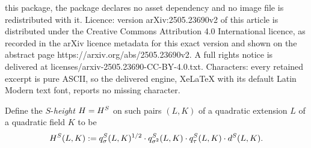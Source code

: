\documentclass[10pt,a4paper]{amsart}
\def\H{{\rm H}}
\newcommand{\D}{{\rm d}}
\newcommand{\q}{{\rm q}}
\begin{document}
this package, the package declares no asset dependency and no image file is redistributed with it. Licence: version arXiv:2505.23690v2 of this article is distributed under the Creative Commons Attribution 4.0 International licence, as recorded in the arXiv licence metadata for this exact version and shown on the abstract page https://arxiv.org/abs/2505.23690v2. A full rights notice is delivered at licenses/arxiv-2505.23690-CC-BY-4.0.txt. Characters: every retained excerpt is pure ASCII, so the delivered engine, XeLaTeX with its default Latin Modern text font, reports no missing character.
\begin{defn}\label{sheight}
Define the $S$-{\it height} $\H=\H^S$ on such pairs $(L,K)$ of a quadratic
extension $L$ of a quadratic field $K$ to be
\begin{equation*}
\H^S(L,K):=\q_\sigma^{S}(L,K)^{1/2} \cdot \q^S_{\sigma^2}(L,K) \cdot \q^S_{\tau}(L,K) \cdot\D^{S}(L,K).
\end{equation*}
\end{defn}
\end{document}
